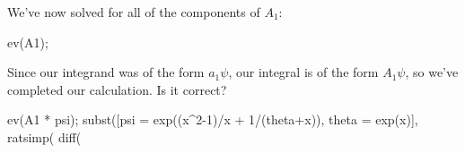 We've now solved for all of the components of $A_1$:

\begin{maximablock}
ev(A1);
\end{maximablock}

Since our integrand was of the form $a_1 \psi$, our integral is of the
form $A_1 \psi$, so we've completed our calculation.  Is it correct?

\begin{maximablock}
ev(A1 * psi);
subst([psi = exp((x^2-1)/x + 1/(theta+x)),
       theta = exp(x)],
ratsimp(%
diff(%
\end{maximablock}


\endexample

\begin{comment}
\vfill\eject

Consider an irreducible factor $F$ that appears both as a factor of $A$
and also in $q$'s denominator, with
multiplicity $m \ge 1 $, so $q = N/(F^m D)$, and we rewrite the Risch equation:

$$A F q' - B q = C$$

$$A F \frac{N' F D - m N F' D - N F D'}{F^{m+1} D^2} - B \frac{N}{F^m D} = C$$

$$A F N' D - m A F' N D - A F N D' - B N D = C D^2 F^{m}$$

$$ - m A F' N D - B N D  = C D^2 F^{m} - A F N' D + A F N D'$$

$$ - (m A F' - B ) N D  = F (C D^2 F^{m-1} - A N' D - A N D')$$

Now, the right hand side of this equation is a multiple of $F$, so the
left hand side must also be a multiple of $F$.  However, $F$ is
irreducible and is relatively prime to both $N$ and $D$, so the only way
the left hand side can be a multiple of $F$ is if $m A F' - B$ is a
multiple of $F$.

Why?  All of these variables
are polynomials in ${\mathbb C}[x]$, so this equation is an equality
between polynomials.  Because ${\mathbb C}[x]$ is a {\it unique factorization domain}, its
polynomials can factor in essentially one way only, so if $F$ factors
the right hand side, it must also factor the left.  If $F$ were not
irreducible, then it might have two factors, one contributed by $N$
and the other contributed by $D$.  It's the irreducibility of $F$,
the unique factorization of polynomials in ${\mathbb C}[x]$, and
our assumption that $N$ and $D$ are relatively prime to $F$
that makes this argument work.

The simplest way to enforce this factorization requirement is to use
the resultant (Theorem \ref{resultant theorem}):

$${\rm res}_x(m A F' - B, F) = 0$$

We calculate this resultant for each irreducible factor $F$ of $A$,
and this gives us $m$, the power to which $F$ appears in $q$'s
denominator.  If this resultant equation has no positive integer
solution, then $F$ can not appear at all in $q$'s denominator.

\end{comment}

